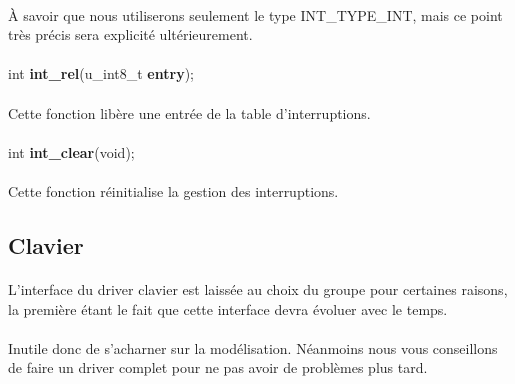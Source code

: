 \documentclass[10pt,a4wide]{article}
\begin{document}
\paragraph{}

\`A savoir que nous utiliserons seulement le type INT\_TYPE\_INT, mais
ce point tr\`es pr\'ecis sera explicit\'e ult\'erieurement.

\paragraph{}

\hspace{1.5cm}int \textbf{int\_rel}(u\_int8\_t \textbf{entry});

\paragraph{}

Cette fonction lib\`ere une entr\'ee de la table d'interruptions.

\paragraph{}

\hspace{1.5cm}int \textbf{int\_clear}(void);

\paragraph{}

Cette fonction r\'einitialise la gestion des interruptions.

\subsection{Clavier}

\paragraph{}

L'interface du driver clavier est laiss\'ee au choix du groupe pour certaines
raisons, la premi\`ere \'etant le fait que cette interface devra \'evoluer
avec le temps.

\paragraph{}

Inutile donc de s'acharner sur la mod\'elisation. N\'eanmoins nous vous
conseillons de faire un driver complet pour ne pas avoir de probl\`emes
plus tard.
\end{document}
